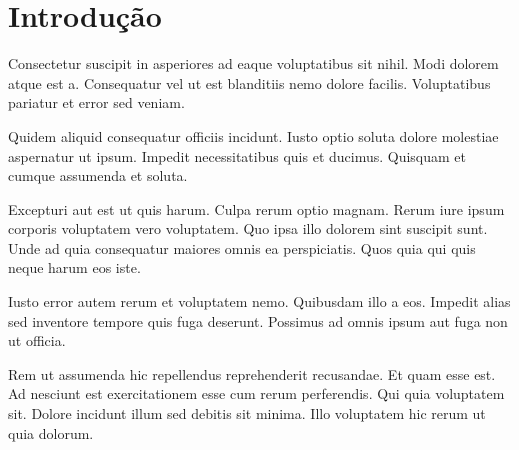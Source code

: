 \section{Introdução}

Consectetur suscipit in asperiores ad eaque voluptatibus sit nihil. Modi dolorem atque est a. Consequatur vel ut est blanditiis nemo dolore facilis. Voluptatibus pariatur et error sed veniam.

Quidem aliquid consequatur officiis incidunt. Iusto optio soluta dolore molestiae aspernatur ut ipsum. Impedit necessitatibus quis et ducimus. Quisquam et cumque assumenda et soluta.

Excepturi aut est ut quis harum. Culpa rerum optio magnam. Rerum iure ipsum corporis voluptatem vero voluptatem. Quo ipsa illo dolorem sint suscipit sunt. Unde ad quia consequatur maiores omnis ea perspiciatis. Quos quia qui quis neque harum eos iste.

Iusto error autem rerum et voluptatem nemo. Quibusdam illo a eos. Impedit alias sed inventore tempore quis fuga deserunt. Possimus ad omnis ipsum aut fuga non ut officia.

Rem ut assumenda hic repellendus reprehenderit recusandae. Et quam esse est. Ad nesciunt est exercitationem esse cum rerum perferendis. Qui quia voluptatem sit. Dolore incidunt illum sed debitis sit minima. Illo voluptatem hic rerum ut quia dolorum.